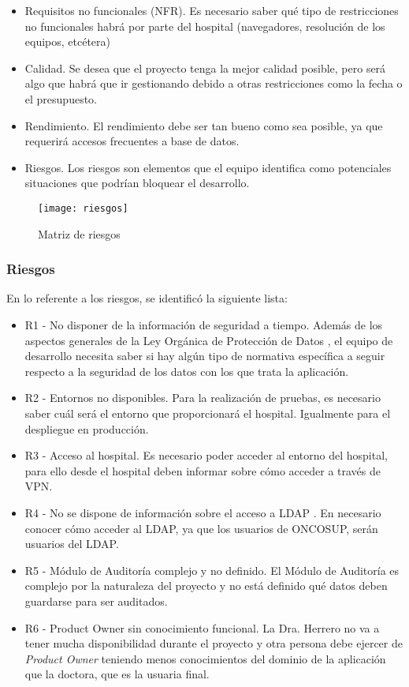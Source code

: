 \begin{itemize}
\item Requisitos no funcionales (NFR). Es necesario saber qué tipo de restricciones no funcionales habrá por parte del hospital (navegadores, resolución de los equipos, etcétera)
\item Calidad. Se desea que el proyecto tenga la mejor calidad posible, pero será algo que habrá que ir gestionando debido a otras restricciones como la fecha o el presupuesto.
\item Rendimiento. El rendimiento debe ser tan bueno como sea posible, ya que requerirá accesos frecuentes a base de datos.
\item Riesgos. Los riesgos son elementos que el equipo identifica como potenciales situaciones que podrían bloquear el desarrollo.
\end{itemize}

\begin{figure}[!h]
\begin{center}
\texttt{[image: riesgos]}
\caption{Matriz de riesgos}
\label{fig:riesgos}
\end{center}
\end{figure}


\subsubsection{Riesgos}
\label{subsubsec:riesgos}

En lo referente a los riesgos, se identificó la siguiente lista:
\begin{itemize}
\item R1 - No disponer de la información de seguridad a tiempo. Además de los aspectos generales de la Ley Orgánica de Protección de Datos \cite{lopd}, el equipo de desarrollo necesita saber si hay algún tipo de normativa específica a seguir respecto a la seguridad de los datos con los que trata la aplicación.
\item R2 - Entornos no disponibles. Para la realización de pruebas, es necesario saber cuál será el entorno que proporcionará el hospital. Igualmente para el despliegue en producción.
\item R3 - Acceso al hospital. Es necesario poder acceder al entorno del hospital, para ello desde el hospital deben informar sobre cómo acceder a través de VPN.
\item R4 - No se dispone de información sobre el acceso a LDAP \cite{ldap}. En necesario conocer cómo acceder al LDAP, ya que los usuarios de ONCOSUP, serán usuarios del LDAP.
\item R5 - Módulo de Auditoría complejo y no definido. El Módulo de Auditoría es complejo por la naturaleza del proyecto y no está definido qué datos deben guardarse para ser auditados.
\item R6 - Product Owner sin conocimiento funcional. La Dra. Herrero no va a tener mucha disponibilidad durante el proyecto y otra persona debe ejercer de \emph{Product Owner} teniendo menos conocimientos del dominio de la aplicación que la doctora, que es la usuaria final.
\end{itemize}

